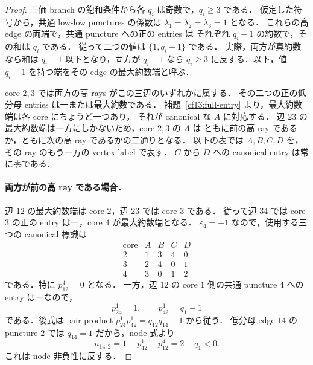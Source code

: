 \begin{proof}
三価 branch の飽和条件から各 $q_i$ は奇数で，$q_i\geq3$ である．
仮定した符号から，共通 low-low punctures の係数は
$\lambda_1=\lambda_2=\lambda_3=1$ となる．
これらの高 edge の両端で，共通 puncture への正の entries は
それぞれ $q_i-1$ の約数で，その和は $q_i$ である．
従って二つの値は $\{1,q_i-1\}$ である．
実際，両方が真約数なら和は $q_i-1$ 以下となり，両方が $q_i-1$ なら
$q_i\geq3$ に反する．以下，値 $q_i-1$ を持つ端をその edge の最大約数端と呼ぶ．

core $2,3$ では両方の高 rays がこの三辺のいずれかに属する．
その二つの正の低分母 entries は一または最大約数である．
補題~\ref{cf13:full-entry} より，最大約数端は各 core にちょうど一つあり，
それが canonical な $A$ に対応する．
辺 $23$ の最大約数端は一方にしかないため，core $2,3$ の $A$ は
ともに前の高 ray であるか，ともに次の高 ray であるかの二通りとなる．
以下の表では $A,B,C,D$ を，その ray のもう一方の vertex label で表す．
$C$ から $D$ への canonical entry は常に零である．

\paragraph{両方が前の高 ray である場合．}
辺 $12$ の最大約数端は core $2$，辺 $23$ では core $3$ である．
従って辺 $34$ では core $3$ の正の entry は一，core $4$ が最大約数端となる．
$\varepsilon_4=-1$ なので，使用する三つの canonical 標識は
\[
\begin{array}{c|rrrr}
\text{core}&A&B&C&D\\ \hline
2&1&3&4&0\\
3&2&4&0&1\\
4&3&0&1&2
\end{array}
\]
である．特に $p^4_{12}=0$ となる．
一方，辺 $12$ の core $1$ 側の共通 puncture $4$ への entry は一なので，
\[
 p^1_{24}=1,\qquad p^1_{42}=q_1-1
\]
である．後式は pair product $p^1_{24}p^1_{42}=q_{12}q_{14}-1$ から従う．
低分母 edge $14$ の puncture $2$ では $q_{14}=1$ だから，node 式より
\begin{equation}\label{cf13:negative-node-forward}
 n_{14;2}=1-p^1_{42}-p^4_{12}=2-q_1<0.
\end{equation}
これは node 非負性に反する．


\end{proof}
